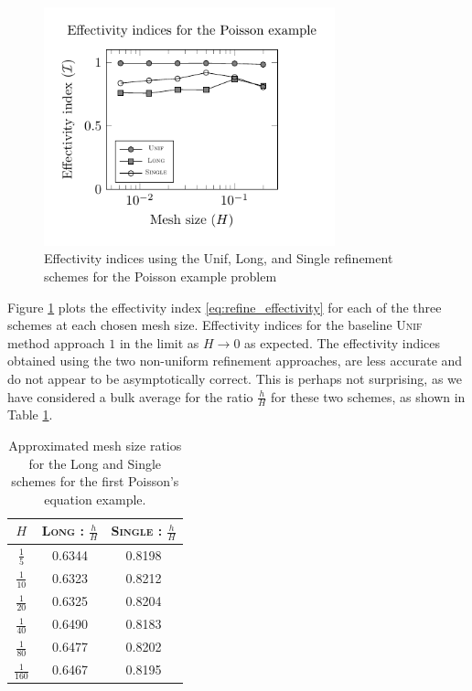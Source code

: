 \begin{figure}[ht!]
\centering
\includegraphics[width=0.75\textwidth]{img/refine_poisson_effectivity}
\caption{Effectivity indices using the Unif,
Long, and Single refinement schemes for
the Poisson example problem}
\label{fig:refine_poisson_effectivity}
\end{figure}

Figure \ref{fig:refine_poisson_effectivity} plots
the effectivity index \eqref{eq:refine_effectivity}
for each of the three schemes at each chosen
mesh size. Effectivity indices for the
baseline \textsc{Unif} method approach
$1$ in the limit as $H \to 0$ as expected. The effectivity
indices obtained using the two non-uniform refinement approaches,
are less accurate
and do not appear to be asymptotically correct.
This is perhaps not surprising, as we have considered a bulk
average for the ratio $\frac{h}{H}$ for these two schemes,
as shown in Table \ref{tab:refine_poisson_ratios}.

%
\begin{table}[ht!]
\centering
\begin{tabular}{ | c | c | c | } \hline
$H$ & \textsc{Long} : $\frac{h}{H}$ & \textsc{Single} : $\frac{h}{H}$ \\ \hline \hline
$\frac{1}{5}$ & 0.6344 & 0.8198 \\ \hline
$\frac{1}{10}$ & 0.6323 & 0.8212 \\ \hline
$\frac{1}{20}$ & 0.6325 & 0.8204 \\ \hline
$\frac{1}{40}$ & 0.6490 & 0.8183 \\ \hline
$\frac{1}{80}$ & 0.6477 & 0.8202 \\ \hline
$\frac{1}{160}$ & 0.6467 & 0.8195 \\ \hline
\end{tabular}
\caption{Approximated mesh size ratios for the Long and
Single schemes for the first Poisson's equation example.}
\label{tab:refine_poisson_ratios}
\end{table}

